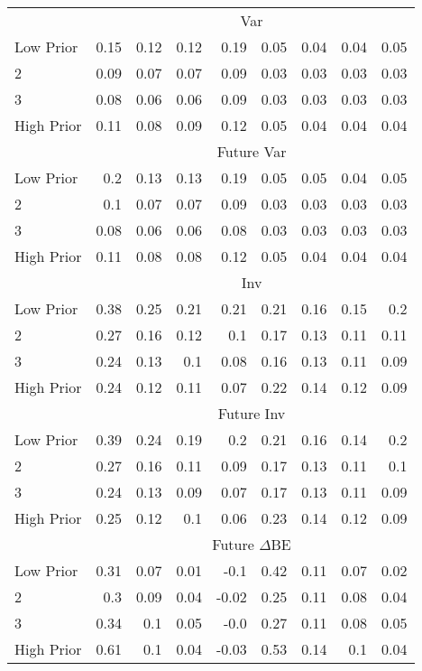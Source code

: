 \begin{table}[!ht]
\begin{tabular}{lrrrrrrrr}
  
    & \multicolumn{8}{c}{Var}  \\
     \cmidrule(r){2-5} \cmidrule(r){6-9}
    Low Prior  & 0.15  & 0.12  & 0.12  & 0.19  & 0.05  & 0.04  & 0.04  & 0.05   \\
    2  & 0.09  & 0.07  & 0.07  & 0.09  & 0.03  & 0.03  & 0.03  & 0.03   \\
    3  & 0.08  & 0.06  & 0.06  & 0.09  & 0.03  & 0.03  & 0.03  & 0.03   \\
    High Prior  & 0.11  & 0.08  & 0.09  & 0.12  & 0.05  & 0.04  & 0.04  & 0.04   \\
    
  
    & \multicolumn{8}{c}{Future Var}  \\
     \cmidrule(r){2-5} \cmidrule(r){6-9}
    Low Prior  & 0.2  & 0.13  & 0.13  & 0.19  & 0.05  & 0.05  & 0.04  & 0.05   \\
    2  & 0.1  & 0.07  & 0.07  & 0.09  & 0.03  & 0.03  & 0.03  & 0.03   \\
    3  & 0.08  & 0.06  & 0.06  & 0.08  & 0.03  & 0.03  & 0.03  & 0.03   \\
    High Prior  & 0.11  & 0.08  & 0.08  & 0.12  & 0.05  & 0.04  & 0.04  & 0.04   \\
    
  
    & \multicolumn{8}{c}{Inv}  \\
     \cmidrule(r){2-5} \cmidrule(r){6-9}
    Low Prior  & 0.38  & 0.25  & 0.21  & 0.21  & 0.21  & 0.16  & 0.15  & 0.2   \\
    2  & 0.27  & 0.16  & 0.12  & 0.1  & 0.17  & 0.13  & 0.11  & 0.11   \\
    3  & 0.24  & 0.13  & 0.1  & 0.08  & 0.16  & 0.13  & 0.11  & 0.09   \\
    High Prior  & 0.24  & 0.12  & 0.11  & 0.07  & 0.22  & 0.14  & 0.12  & 0.09   \\
    
  
    & \multicolumn{8}{c}{Future Inv}  \\
     \cmidrule(r){2-5} \cmidrule(r){6-9}
    Low Prior  & 0.39  & 0.24  & 0.19  & 0.2  & 0.21  & 0.16  & 0.14  & 0.2   \\
    2  & 0.27  & 0.16  & 0.11  & 0.09  & 0.17  & 0.13  & 0.11  & 0.1   \\
    3  & 0.24  & 0.13  & 0.09  & 0.07  & 0.17  & 0.13  & 0.11  & 0.09   \\
    High Prior  & 0.25  & 0.12  & 0.1  & 0.06  & 0.23  & 0.14  & 0.12  & 0.09   \\
    
  
    & \multicolumn{8}{c}{Future $\Delta\text{BE}$}  \\
     \cmidrule(r){2-5} \cmidrule(r){6-9}
    Low Prior  & 0.31  & 0.07  & 0.01  & -0.1  & 0.42  & 0.11  & 0.07  & 0.02   \\
    2  & 0.3  & 0.09  & 0.04  & -0.02  & 0.25  & 0.11  & 0.08  & 0.04   \\
    3  & 0.34  & 0.1  & 0.05  & -0.0  & 0.27  & 0.11  & 0.08  & 0.05   \\
    High Prior  & 0.61  & 0.1  & 0.04  & -0.03  & 0.53  & 0.14  & 0.1  & 0.04   \\
    

\end{tabular}
\end{table}
